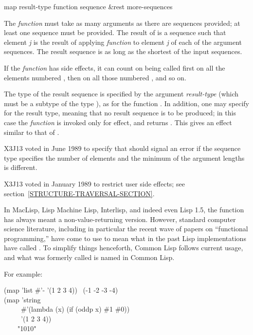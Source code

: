 \begin{defun}[Function]
map result-type function sequence &rest more-sequences

The {\it function} must take as many arguments as there are sequences
provided; at least one sequence must be provided.
The result of  is a sequence such that element {\it j} is the result
of applying {\it function} to element {\it j} of each of the argument
sequences.  The result sequence is as long as the shortest of the
input sequences.

If the {\it function} has side effects, it can count on being called
first on all the elements numbered , then on all those
numbered , and so on.

The type of the result sequence is specified by the argument {\it result-type}
(which must be a subtype of the type ),
as for the function .
In addition, one may specify {\nil} for the result type, meaning that no
result sequence is to be produced; in this case the {\it function} is invoked
only for effect, and  returns {\nil}.  This gives an effect similar
to that of .

\begin{newer}
X3J13 voted in June 1989  to specify that
 should signal an error if the sequence type specifies the number of
elements and the minimum of the argument lengths is different.
\end{newer}

\begin{new}
X3J13 voted in January 1989
to restrict user side effects; see section~\ref{STRUCTURE-TRAVERSAL-SECTION}.
\end{new}

\beforenoterule
\begin{incompatibility}
In MacLisp, Lisp Machine Lisp, Interlisp, and indeed even
Lisp 1.5, the function  has always meant a non-value-returning
version.  However, standard computer science literature, including
in particular
the recent wave of papers on ``functional programming,'' have come
to use  to mean
what in the past Lisp implementations have called .
To simplify things henceforth, Common Lisp follows current usage,
and what was formerly called  is named  in Common Lisp.
\end{incompatibility}
\afternoterule

\noindent
For example:
\begin{lisp}
(map 'list \#'- '(1 2 3 4)) \EV\ (-1 -2 -3 -4) \\
(map 'string \\
~~~~~\#'(lambda (x) (if (oddp x) \#{\Xbackslash}1 \#{\Xbackslash}0)) \\
~~~~~'(1 2 3 4)) \\
~~~\EV\ "1010"
\end{lisp}
\end{defun}


